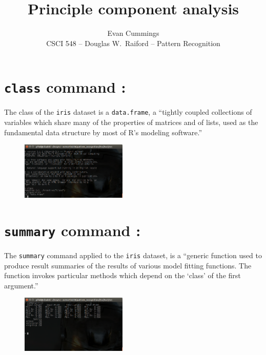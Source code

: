 


\footnotesize

\title{Principle component analysis}
\author{Evan Cummings\\
CSCI 548 -- Douglas W.~Raiford -- Pattern Recognition}

\maketitle
\begin{multicols*}{2}

\section{\texttt{class} command :}

The class of the \texttt{iris} dataset is a \texttt{data.frame}, a ``tightly coupled collections of variables which share many of the properties of matrices and of lists, used as the fundamental data structure by most of R's modeling software.''

\begin{figure}[H]
  \centering
    \includegraphics[width=0.45\textwidth]{images/class_command.png}
\end{figure}

\section{\texttt{summary} command :}

The \texttt{summary} command applied to the \texttt{iris} dataset, is a ``generic function used to produce result summaries of the results of various model fitting functions.  The function invokes particular methods which depend on the `class' of the first argument.''

\begin{figure}[H]
  \centering
    \includegraphics[width=0.45\textwidth]{images/summary_command.png}
\end{figure}


\end{multicols*}
